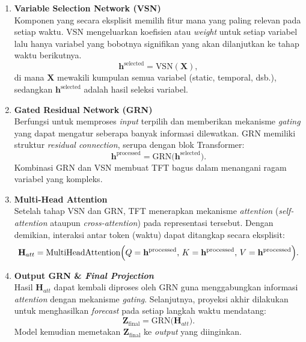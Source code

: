 \begin{enumerate}
    \item \textbf{Variable Selection Network (VSN)} \\
    Komponen yang secara eksplisit memilih fitur mana yang paling relevan pada setiap waktu. VSN mengeluarkan koefisien atau \textit{weight} untuk setiap variabel lalu hanya variabel yang bobotnya signifikan yang akan dilanjutkan ke tahap waktu berikutnya.
    \[
    \mathbf{h}^{\text{selected}} = \text{VSN}(\mathbf{X}),
    \]
    di mana \(\mathbf{X}\) mewakili kumpulan semua variabel (static, temporal, dsb.), sedangkan \(\mathbf{h}^{\text{selected}}\) adalah hasil seleksi variabel.

    \item \textbf{Gated Residual Network (GRN)} \\
    Berfungsi untuk memproses \textit{input} terpilih dan memberikan mekanisme \textit{gating} yang dapat mengatur seberapa banyak informasi dilewatkan. GRN memiliki struktur \textit{residual connection}, serupa dengan blok Transformer:
    \[
    \mathbf{h}^{\text{processed}} = \text{GRN}\bigl(\mathbf{h}^{\text{selected}}\bigr).
    \]
    Kombinasi GRN dan VSN membuat TFT bagus dalam menangani ragam variabel yang kompleks.

    \item \textbf{Multi-Head Attention} \\
    Setelah tahap VSN dan GRN, TFT menerapkan mekanisme \textit{attention} (\textit{self-attention} ataupun \textit{cross-attention}) pada representasi tersebut. Dengan demikian, interaksi antar token (waktu) dapat ditangkap secara eksplisit:
    \[
    \mathbf{H}_{att} = \text{MultiHeadAttention}\Bigl(
        Q = \mathbf{h}^{\text{processed}},\,
        K = \mathbf{h}^{\text{processed}},\,
        V = \mathbf{h}^{\text{processed}}
    \Bigr).
    \]

    \item \textbf{Output GRN \& \textit{Final Projection}} \\
    Hasil \(\mathbf{H}_{att}\) dapat kembali diproses oleh GRN guna menggabungkan informasi \textit{attention} dengan mekanisme \textit{gating}. Selanjutnya, proyeksi akhir dilakukan untuk menghasilkan \textit{forecast} pada setiap langkah waktu mendatang:
    \[
    \mathbf{Z}_{\text{final}} = \text{GRN}\bigl(\mathbf{H}_{att}\bigr).
    \]
    Model kemudian memetakan \(\mathbf{Z}_{\text{final}}\) ke \textit{output} yang diinginkan.
\end{enumerate}

